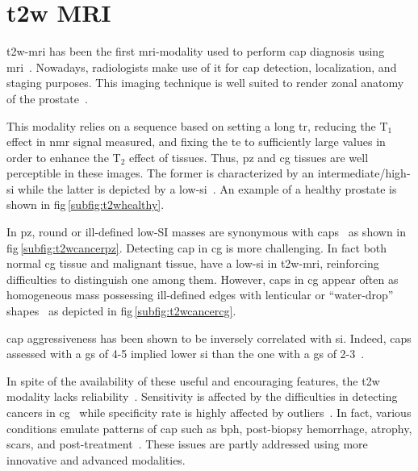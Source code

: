 \section{\acs*{t2w} MRI}\label{subsec:chp2:imaging:t2w} 
\ac{t2w}-\ac{mri} has been the first \ac{mri}-modality used to perform \ac{cap} diagnosis using \ac{mri}~\cite{Hricak1983}.
Nowadays, radiologists make use of it for \ac{cap} detection, localization, and staging purposes.
This imaging technique is well suited to render zonal anatomy of the prostate~\cite{Barentsz2012}. 

This modality relies on a sequence based on setting a long \ac{tr}, reducing the T$_{1}$ effect in \ac{nmr} signal measured, and fixing the \ac{te} to sufficiently large values in order to enhance the T$_{2}$ effect of tissues.
Thus, \ac{pz} and \ac{cg} tissues are well perceptible in these images.
The former is characterized by an intermediate/high-\ac{si} while the latter is depicted by a low-\ac{si}~\cite{Hricak1987}.
An example of a healthy prostate is shown in \acs{fig}\,\ref{subfig:t2whealthy}.

In \ac{pz}, round or ill-defined low-SI masses are synonymous with \acp{cap}~\cite{Hricak1983} as shown in \acs{fig}\,\ref{subfig:t2wcancerpz}.
Detecting \ac{cap} in \ac{cg} is more challenging.
In fact both normal \ac{cg} tissue and malignant tissue, have a low-\ac{si} in \ac{t2w}-\ac{mri}, reinforcing difficulties to distinguish one among them.
However, \acp{cap} in \ac{cg} appear often as homogeneous mass possessing ill-defined edges with lenticular or ``water-drop'' shapes~\cite{Akin2006,Barentsz2012} as depicted in \acs{fig}\,\ref{subfig:t2wcancercg}. 

\ac{cap} aggressiveness has been shown to be inversely correlated with \ac{si}.
Indeed, \acp{cap} assessed with a \ac{gs} of 4-5 implied lower \ac{si} than the one with a \ac{gs} of 2-3~\cite{Wang2008}.

In spite of the availability of these useful and encouraging features, the \ac{t2w} modality lacks reliability~\cite{Kirkham2006,Hoeks2011}.
Sensitivity is affected by the difficulties in detecting cancers in \ac{cg}~\cite{Kirkham2006} while specificity rate is highly affected by outliers~\cite{Barentsz2012}.
In fact, various conditions emulate patterns of \ac{cap} such as \ac{bph}, post-biopsy hemorrhage, atrophy, scars, and post-treatment~\cite{Hricak1987,Quint1991,Scheidler1999,Cruz2002,Barentsz2012}.
These issues are partly addressed using more innovative and advanced modalities.

